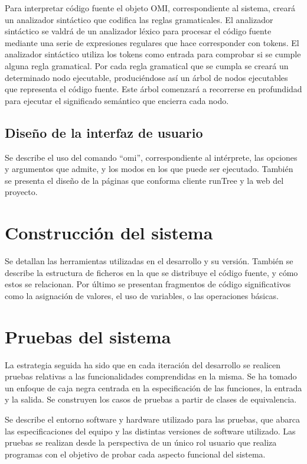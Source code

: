 Para interpretar código fuente el objeto OMI, correspondiente al sistema, creará un analizador sintáctico que codifica las reglas gramaticales. El analizador sintáctico se valdrá de un analizador léxico 
para procesar el código fuente mediante una serie de expresiones regulares que hace corresponder con tokens. El analizador sintáctico utiliza los tokens como entrada para comprobar si se cumple 
alguna regla gramatical. Por cada regla gramatical que se cumpla se creará un determinado nodo ejecutable, produciéndose así un árbol de nodos ejecutables que representa el código fuente.  Este árbol comenzará
a recorrerse en profundidad para ejecutar el significado semántico que encierra cada nodo. 

\subsection{Diseño de la interfaz de usuario}
Se describe el uso del comando ``omi'', correspondiente al intérprete, las opciones y argumentos que admite, y los modos en los que puede ser ejecutado. También se presenta el diseño de la páginas
que conforma cliente runTree y la web del proyecto.

\section{Construcción del sistema}
 Se detallan las herramientas utilizadas en el desarrollo y su versión. También se describe la estructura de ficheros en la que se distribuye el código fuente, y cómo estos se relacionan. Por último se presentan 
 fragmentos de código significativos como la asignación de valores, el uso de variables, o las operaciones básicas.
 
\section{Pruebas del sistema}
La estrategia seguida ha sido que en cada iteración del desarrollo se realicen pruebas relativas a las funcionalidades comprendidas en la misma. Se ha tomado un enfoque de 
caja negra centrada en la especificación de las funciones, la entrada y la salida. Se construyen los casos de pruebas a partir de clases de equivalencia.

Se describe el entorno software y hardware utilizado para las pruebas, que abarca las especificaciones del equipo y las distintas versiones de software utilizado. Las pruebas se realizan desde la perspectiva de
un único rol usuario que realiza programas con el objetivo de probar cada aspecto funcional del sistema.

